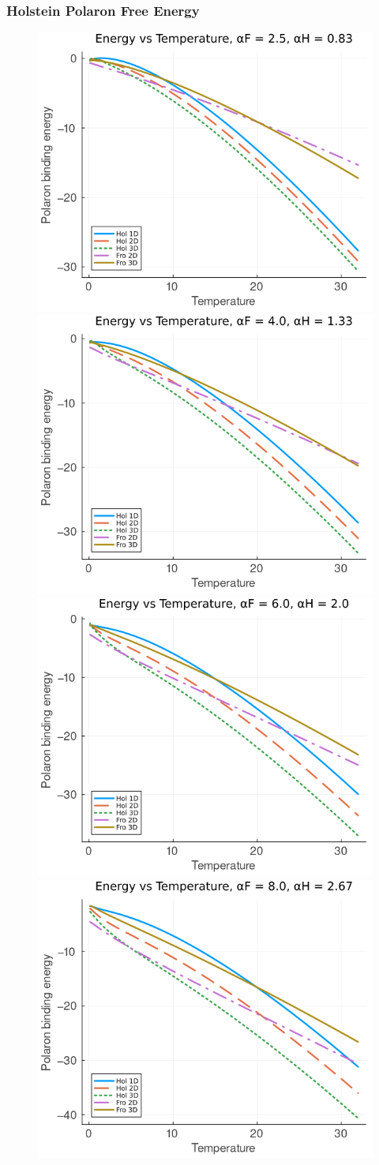 \subsubsection{Holstein Polaron Free Energy}

\begin{figure}[!tbp]
    \includegraphics[width=.49\textwidth]{figures/energy_temp_25_083.png}
    \includegraphics[width=.49\textwidth]{figures/energy_temp_4_133.png}
    \includegraphics[width=.49\textwidth]{figures/energy_temp_6_2.png}
    \includegraphics[width=.49\textwidth]{figures/energy_temp_8_267.png}

\end{figure}
